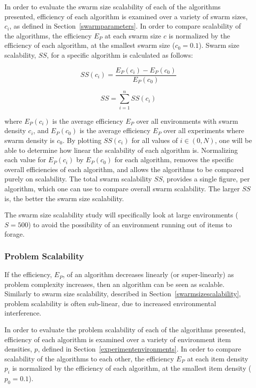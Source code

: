 In order to evaluate the swarm size scalability of each of the algorithms presented, efficiency of each algorithm is examined over a variety of swarm sizes, $c_i$, as defined in Section~\ref{swarmparameters}. In order to compare scalability of the algorithms, the efficiency $E_P$ at each swarm size $c$ is normalized by the efficiency of each algorithm, at the smallest swarm size ($c_0=0.1$). Swarm size scalability, $SS$, for a specific algorithm is calculated as follows:

\begin{equation}
	SS(c_i) = \dfrac{E_P(c_i)-E_P(c_0)}{E_P(c_0)}
\end{equation}

\begin{equation}
	SS = \sum_{i=1}^{n} SS(c_i)
\end{equation}

where $E_P(c_i)$ is the average efficiency $E_P$ over all environments with swarm density $c_i$, and $E_P(c_0)$ is the average efficiency $E_P$ over all experiments where swarm density is $c_0$. By plotting $SS(c_i)$ for all values of $i\in(0,N)$, one will be able to determine how linear the scalability of each algorithm is. Normalizing each value for $E_P(c_i)$ by $E_P(c_0)$ for each algorithm, removes the specific overall efficiencies of each algorithm, and allows the algorithms to be compared purely on scalability. The total swarm scalability $SS$, provides a single figure, per algorithm, which one can use to compare overall swarm scalability. The larger $SS$ is, the better the swarm size scalability. 

The swarm size scalability study will specifically look at large environments ($S=500$) to avoid the possibility of an environment running out of items to forage.

\subsubsection{Problem Scalability}
\label{setup:problemscalability}
If the efficiency, $E_P$, of an algorithm decreases linearly (or super-linearly) as problem complexity increases, then an algorithm can be seen as scalable. Similarly to swarm size scalability, described in Section~\ref{swarmsizescalability}, problem scalability is often sub-linear, due to increased environmental interference.

In order to evaluate the problem scalability of each of the algorithms presented, efficiency of each algorithm is examined over a variety of environment item densities, $p$, defined in Section~\ref{experimentenvironments}. In order to compare scalability of the algorithms to each other, the efficiency $E_P$ at each item density $p_i$ is normalized by the efficiency of each algorithm, at the smallest item density ($p_0=0.1$). 

